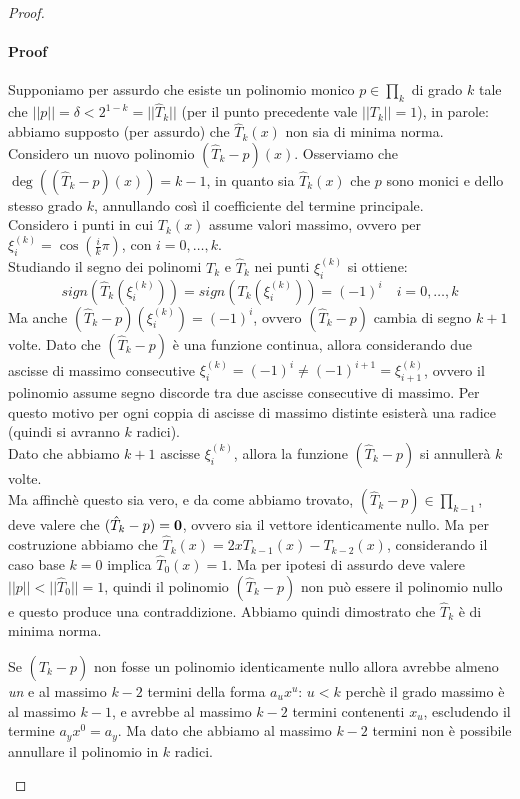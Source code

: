 \begin{proof}
\begin{itemize}
  \paragraph{Proof} Supponiamo per assurdo che esiste un polinomio monico $p
  \in \prod_{k}$ di grado $k$ tale che $||p|| = \delta < 2^{1-k} =
  ||\hat{T}_{k}||$ (per il punto precedente vale $||T_{k}|| = 1$), in parole:
  abbiamo supposto (per assurdo) che $\hat{T}_{k}(x)$ non sia di minima norma. 
  \\ Considero un nuovo polinomio $(\hat{T}_{k} - p)(x)$. Osserviamo che
  $\deg((\hat{T}_{k} - p)(x)) = k-1$, in quanto sia $\hat{T}_{k}(x)$ che $p$
  sono monici e dello stesso grado $k$, annullando cos\`i il coefficiente del
  termine principale. \\
  Considero i punti in cui $T_{k}(x)$ assume valori massimo, ovvero per 
  $\xi_{i}^{(k)} = \cos\left(\frac{i}{k}\pi\right)$, con $i = 0,\ldots,k$.
  \\Studiando il segno dei polinomi $T_{k}$ e $\hat{T}_{k}$ nei punti
  $\xi_{i}^{(k)}$ si ottiene: $$sign(\hat{T}_{k}(\xi_{i}^{(k)})) =
  sign(T_{k}(\xi_{i}^{(k)})) = (-1)^{i} \quad i = 0,\ldots,k$$
  Ma anche $(\hat{T}_{k} - p)(\xi_{i}^{(k)}) = (-1)^{i}$, ovvero $(\hat{T}_{k} -
  p)$ cambia di segno $k + 1$ volte. Dato che $(\hat{T}_{k} - p)$ \`e una
  funzione continua, allora considerando due ascisse di massimo
  consecutive $\xi_{i}^{(k)} = (-1)^{i} \not = (-1)^{i+1} = \xi_{i+1}^{(k)}$,
  ovvero il polinomio assume segno discorde tra due ascisse consecutive di
  massimo. Per questo motivo per ogni coppia di ascisse di massimo distinte 
  esister\`a una radice (quindi si avranno $k$ radici). \\ 
  Dato che abbiamo $k+1$ ascisse $\xi_{i}^{(k)}$, allora la funzione 
  $(\hat{T}_{k} - p)$ si annuller\`a $k$ volte. \\ Ma affinch\`e questo sia 
  vero, e da come abbiamo trovato, $(\hat{T}_{k} - p) \in \prod_{k-1}$,  deve
  valere che $(\hat{T}_{k} - p) = \boldsymbol{0}$, ovvero sia il vettore 
  identicamente nullo. Ma per costruzione abbiamo che $\hat{T}_{k}(x) =
  2xT_{k-1}(x)-T_{k-2}(x)$, considerando il caso base $k = 0$ implica
  $\hat{T}_{0}(x) = 1$. Ma per ipotesi di assurdo deve valere $||p|| <
  ||\hat{T}_{0}|| = 1$, quindi il polinomio  $(\hat{T}_{k} - p)$ non pu\`o
  essere il polinomio nullo e questo produce una contraddizione.
  Abbiamo quindi dimostrato che $\hat{T}_{k}$ \`e di minima norma.
  
  Se $(\hat{T}_{k} - p)$ non fosse un polinomio
  identicamente nullo allora avrebbe almeno \emph{un} e al massimo $k-2$ termini
  della forma $a_{u}x^{u}$: $u < k$ perch\`e il grado massimo \`e al massimo
  $k-1$, e avrebbe al massimo $k-2$ termini contenenti $x_{u}$, escludendo il
  termine $a_{y}x^{0} = a_{y}$. Ma dato che abbiamo al massimo $k-2$ termini non
  \`e possibile annullare il polinomio in $k$ radici.
\end{itemize}
\end{proof}

